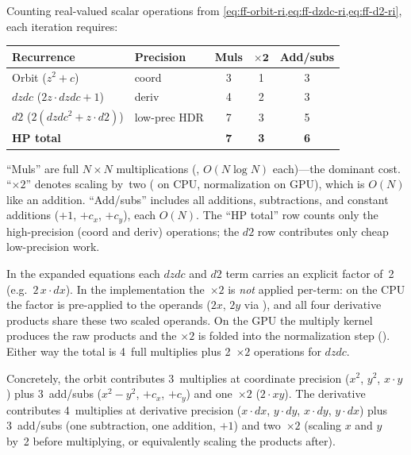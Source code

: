 Counting real-valued scalar operations from
\cref{eq:ff-orbit-ri,eq:ff-dzdc-ri,eq:ff-d2-ri}, each iteration requires:

\begin{center}
\small
\begin{tabular}{llccc}
\hline
\textbf{Recurrence} & \textbf{Precision} &
  \textbf{Muls} & $\boldsymbol{\times 2}$ & \textbf{Add/subs} \\
\hline
Orbit ($z^2 + c$) & coord &
  3 & 1 & 3 \\
$\mathit{dzdc}$ ($2z \cdot \mathit{dzdc} + 1$) & deriv &
  4 & 2 & 3 \\
$d2$ ($2(\mathit{dzdc}^2 {+} z {\cdot} d2)$) & low-prec HDR &
  7 & 3 & 5 \\
\hline
\textbf{HP total} & &
  \textbf{7} & \textbf{3} & \textbf{6} \\
\hline
\end{tabular}
\end{center}

\noindent
``Muls'' are full $N \times N$ multiplications (, $O(N \log
N)$ each)---the dominant cost.  ``$\times 2$'' denotes scaling by~two
( on CPU,  normalization on GPU), which is
$O(N)$ like an addition.  ``Add/subs'' includes all additions,
subtractions, and constant additions ($+1$, $+c_x$, $+c_y$), each $O(N)$.
The ``HP total'' row counts only the high-precision (coord and deriv)
operations; the $d2$ row contributes only cheap low-precision work.

\noindent
In the expanded equations each $\mathit{dzdc}$ and $d2$ term carries an
explicit factor of~2 (e.g.\ $2\,x \cdot dx$).  In the implementation
the~$\times 2$ is \emph{not} applied per-term: on the CPU the factor is
pre-applied to the operands ($2x$, $2y$ via ), and all
four derivative products share these two scaled operands.  On the GPU the
multiply kernel produces the raw products and the $\times 2$ is folded
into the normalization step ().  Either way the total is
4~full multiplies plus 2~$\times 2$ operations for $\mathit{dzdc}$.

\noindent
Concretely, the orbit contributes 3~multiplies at coordinate precision
($x^2$, $y^2$, $x \cdot y$) plus 3~add/subs ($x^2 - y^2$, $+c_x$,
$+c_y$) and one~$\times 2$ ($2 \cdot xy$).  The derivative contributes
4~multiplies at derivative precision ($x \cdot dx$, $y \cdot dy$,
$x \cdot dy$, $y \cdot dx$) plus 3~add/subs (one subtraction, one
addition, $+1$) and two~$\times 2$ (scaling $x$ and $y$ by~2 before
multiplying, or equivalently scaling the products after).

